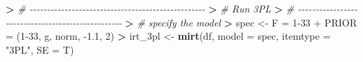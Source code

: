 \documentclass[
]{article}
\newenvironment{Shaded}{\begin{snugshade}}{\end{snugshade}}
\newcommand{\AttributeTok}[1]{\textcolor[rgb]{0.13,0.29,0.53}{#1}}
\newcommand{\CommentTok}[1]{\textcolor[rgb]{0.56,0.35,0.01}{\textit{#1}}}
\newcommand{\ErrorTok}[1]{\textcolor[rgb]{0.64,0.00,0.00}{\textbf{#1}}}
\newcommand{\FunctionTok}[1]{\textcolor[rgb]{0.13,0.29,0.53}{\textbf{#1}}}
\newcommand{\NormalTok}[1]{#1}
\newcommand{\OtherTok}[1]{\textcolor[rgb]{0.56,0.35,0.01}{#1}}
\newcommand{\SpecialCharTok}[1]{\textcolor[rgb]{0.81,0.36,0.00}{\textbf{#1}}}
\newcommand{\StringTok}[1]{\textcolor[rgb]{0.31,0.60,0.02}{#1}}
\begin{document}
\begin{Shaded}
\begin{Highlighting}[]
\SpecialCharTok{\textgreater{}} \CommentTok{\# {-}{-}{-}{-}{-}{-}{-}{-}{-}{-}{-}{-}{-}{-}{-}{-}{-}{-}{-}{-}{-}{-}{-}{-}{-}{-}{-}{-}{-}{-}{-}{-}{-}{-}{-}{-}{-}{-}{-}{-}{-}{-}{-}{-}{-}{-}{-}{-}{-}{-}}
\ErrorTok{\textgreater{}} \CommentTok{\#                       Run 3PL}
\ErrorTok{\textgreater{}} \CommentTok{\# {-}{-}{-}{-}{-}{-}{-}{-}{-}{-}{-}{-}{-}{-}{-}{-}{-}{-}{-}{-}{-}{-}{-}{-}{-}{-}{-}{-}{-}{-}{-}{-}{-}{-}{-}{-}{-}{-}{-}{-}{-}{-}{-}{-}{-}{-}{-}{-}{-}{-}}
\ErrorTok{\textgreater{}} \CommentTok{\# specify the model}
\ErrorTok{\textgreater{}}\NormalTok{ spec }\OtherTok{\textless{}{-}} \StringTok{\textquotesingle{}F = 1{-}33}
\StringTok{+ PRIOR = (1{-}33, g, norm, {-}1.1, 2)\textquotesingle{}}
\SpecialCharTok{\textgreater{}}\NormalTok{ irt\_3pl }\OtherTok{\textless{}{-}} \FunctionTok{mirt}\NormalTok{(df, }\AttributeTok{model =}\NormalTok{ spec, }\AttributeTok{itemtype =} \StringTok{"3PL"}\NormalTok{, }\AttributeTok{SE =}\NormalTok{ T)}

\end{Highlighting}
\end{Shaded}
\end{document}
